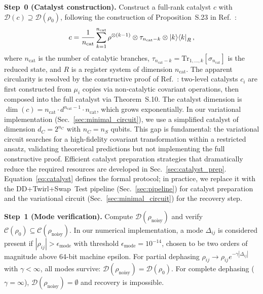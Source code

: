 \documentclass[a4paper,twocolumn]{quantumarticle}
\begin{document}
\textbf{Step~0 (Catalyst construction).}
Construct a full-rank catalyst $c$ with $\mathcal{D}(c) \supseteq \mathcal{D}(\rho_0)$, following the construction of Proposition~S.23 in Ref.~\cite{Shiraishi2024}:
\begin{equation}
c = \frac{1}{n_\mathrm{cat}} \sum_{k=1}^{n_\mathrm{cat}} \rho^{\otimes(k-1)} \otimes \tau_{n_\mathrm{cat}-k} \otimes \ket{k}\!\bra{k}_R,
\label{eq:catalyst}
\end{equation}
where $n_\mathrm{cat}$ is the number of catalytic branches, $\tau_{n_\mathrm{cat}-k} = \mathrm{Tr}_{1,\ldots,k}[\sigma_{n_\mathrm{cat}}]$ is the reduced state, and $R$ is a register system of dimension $n_\mathrm{cat}$.
The apparent circularity is resolved by the constructive proof of Ref.~\cite{Shiraishi2024}: two-level catalysts $c_i$ are first constructed from $\mu_i$ copies via non-catalytic covariant operations, then composed into the full catalyst via Theorem~S.10.
The catalyst dimension is $\dim(c) = n_\mathrm{cat} \cdot d^{n_\mathrm{cat}-1} \cdot n_\mathrm{cat}$, which grows exponentially.
In our variational implementation (Sec.~\ref{sec:minimal_circuit}), we use a simplified catalyst of dimension $d_C = 2^{n_C}$ with $n_C = n_S$ qubits.
This gap is fundamental: the variational circuit searches for a high-fidelity covariant transformation within a restricted ansatz, validating theoretical predictions but not implementing the full constructive proof.
Efficient catalyst preparation strategies that dramatically reduce the required resources are developed in Sec.~\ref{sec:catalyst_prep}.
Equation~\eqref{eq:catalyst} defines the formal protocol; in practice, we replace it with the DD+Twirl+Swap~Test pipeline (Sec.~\ref{sec:pipeline}) for catalyst preparation and the variational circuit (Sec.~\ref{sec:minimal_circuit}) for the recovery step.

\textbf{Step~1 (Mode verification).}
Compute $\mathcal{D}(\rho_\mathrm{noisy})$ and verify $\mathcal{C}(\rho_0) \subseteq \mathcal{C}(\rho_\mathrm{noisy})$.
In our numerical implementation, a mode $\Delta_{ij}$ is considered present if $|\rho_{ij}| > \epsilon_\mathrm{mode}$ with threshold $\epsilon_\mathrm{mode} = 10^{-14}$, chosen to be two orders of magnitude above 64-bit machine epsilon.
For partial dephasing $\rho_{ij} \to \rho_{ij} e^{-\gamma|\Delta_{ij}|}$ with $\gamma < \infty$, all modes survive: $\mathcal{D}(\rho_\mathrm{noisy}) = \mathcal{D}(\rho_0)$.
For complete dephasing ($\gamma = \infty$), $\mathcal{D}(\rho_\mathrm{noisy}) = \emptyset$ and recovery is impossible.
\end{document}
